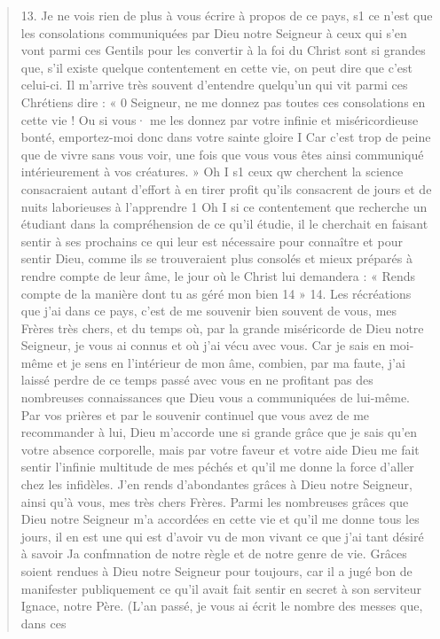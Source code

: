 \begin{quote}
13. Je ne vois rien de plus à vous écrire à propos de ce pays, s1
ce n'est que les consolations communiquées par Dieu notre Seigneur
à ceux qui s'en vont parmi ces Gentils pour les convertir à
la foi du Christ sont si grandes que, s'il existe quelque contentement
en cette vie, on peut dire que c'est celui-ci. Il m'arrive très
souvent d'entendre quelqu'un qui vit parmi ces Chrétiens dire : « 0
Seigneur, ne me donnez pas toutes ces consolations en cette vie !
Ou si vous· me les donnez par votre infinie et miséricordieuse bonté,
emportez-moi donc dans votre sainte gloire I Car c'est trop de
peine que de vivre sans vous voir, une fois que vous vous êtes ainsi
communiqué intérieurement à vos créatures. » Oh I s1 ceux qw
cherchent la science consacraient autant d'effort à en tirer profit
qu'ils consacrent de jours et de nuits laborieuses à l'apprendre 1
Oh I si ce contentement que recherche un étudiant dans la compréhension
de ce qu'il étudie, il le cherchait en faisant sentir à ses
prochains ce qui leur est nécessaire pour connaître et pour sentir
Dieu, comme ils se trouveraient plus consolés et mieux préparés
à rendre compte de leur âme, le jour où le Christ lui demandera :
« Rends compte de la manière dont tu as géré mon bien 14 »
14. Les récréations que j'ai dans ce pays, c'est de me souvenir
bien souvent de vous, mes Frères très chers, et du temps où, par
la grande miséricorde de Dieu notre Seigneur, je vous ai connus
et où j'ai vécu avec vous. Car je sais en moi-même et je sens en
l'intérieur de mon âme, combien, par ma faute, j'ai laissé perdre
de ce temps passé avec vous en ne profitant pas des nombreuses
 connaissances que Dieu vous a communiquées de lui-même. Par
vos prières et par le souvenir continuel que vous avez de me recommander
à lui, Dieu m'accorde une si grande grâce que je sais qu'en
votre absence corporelle, mais par votre faveur et votre aide Dieu
me fait sentir l'infinie multitude de mes péchés et qu'il me donne
la force d'aller chez les infidèles. J'en rends d'abondantes grâces
à Dieu notre Seigneur, ainsi qu'à vous, mes très chers Frères.
Parmi les nombreuses grâces que Dieu notre Seigneur m'a accordées
en cette vie et qu'il me donne tous les jours, il en est une qui
est d'avoir vu de mon vivant ce que j'ai tant désiré à savoir Ja confmnation
de notre règle et de notre genre de vie. Grâces soient rendues
à Dieu notre Seigneur pour toujours, car il a jugé bon de
manifester publiquement ce qu'il avait fait sentir en secret à son
serviteur Ignace, notre Père.
(L'an passé, je vous ai écrit le nombre des messes que, dans ces

\end{quote}
